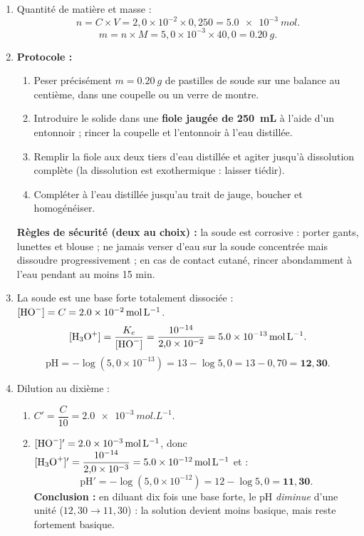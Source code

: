 \documentclass[11pt]{article}
\begin{document}
\begin{corrige}
\begin{enumerate}
\item Quantité de matière et masse :
\[ n = C \times V = 2{,}0\times10^{-2} \times 0{,}250 = \SI{5,0e-3}{mol}. \]
\[ m = n \times M = 5{,}0\times10^{-3} \times 40{,}0 = \SI{0,20}{g}. \]
\item \textbf{Protocole :}
\begin{enumerate}
\item Peser précisément $m = \SI{0,20}{g}$ de pastilles de soude sur une balance au centième, dans une coupelle ou un verre de montre.
\item Introduire le solide dans une \textbf{fiole jaugée de \SI{250}{mL}} à l'aide d'un entonnoir ; rincer la coupelle et l'entonnoir à l'eau distillée.
\item Remplir la fiole aux deux tiers d'eau distillée et agiter jusqu'à dissolution complète (la dissolution est exothermique : laisser tiédir).
\item Compléter à l'eau distillée jusqu'au trait de jauge, boucher et homogénéiser.
\end{enumerate}
\textbf{Règles de sécurité (deux au choix) :} la soude est corrosive : porter gants, lunettes et blouse ; ne jamais verser d'eau sur la soude concentrée mais dissoudre progressivement ; en cas de contact cutané, rincer abondamment à l'eau pendant au moins 15 min.
\item La soude est une base forte totalement dissociée : $[\ce{HO-}] = C = \SI{2,0e-2}{mol.L^{-1}}$.
\[ [\ce{H3O+}] = \frac{K_e}{[\ce{HO-}]} = \frac{10^{-14}}{2{,}0\times10^{-2}} = \SI{5,0e-13}{mol.L^{-1}}. \]
\[ \mathrm{pH} = -\log(5{,}0\times10^{-13}) = 13 - \log 5{,}0 = 13 - 0{,}70 = \mathbf{12{,}30}. \]
\item Dilution au dixième :
\begin{enumerate}
\item $C' = \dfrac{C}{10} = \SI{2,0e-3}{mol.L^{-1}}$.
\item $[\ce{HO-}]' = \SI{2,0e-3}{mol.L^{-1}}$, donc $[\ce{H3O+}]' = \dfrac{10^{-14}}{2{,}0\times10^{-3}} = \SI{5,0e-12}{mol.L^{-1}}$ et :
\[ \mathrm{pH}' = -\log(5{,}0\times10^{-12}) = 12 - \log 5{,}0 = \mathbf{11{,}30}. \]
\textbf{Conclusion :} en diluant dix fois une base forte, le pH \emph{diminue} d'une unité ($12{,}30 \to 11{,}30$) : la solution devient moins basique, mais reste fortement basique.
\end{enumerate}

\end{enumerate}
\end{corrige}
\end{document}

